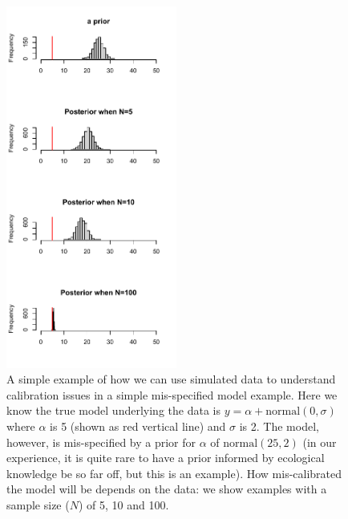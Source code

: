 \documentclass[11pt]{article}
\begin{document}
\begin{figure}[ht]
\centering
\noindent \includegraphics[width=0.5\textwidth]{examples/misspecifiedmodel/priorpostforflows.pdf}
\caption{A simple example of how we can use simulated data to understand calibration issues in a simple mis-specified model example. Here we know the true model underlying the data is $y=\alpha + \text{normal}(0, \sigma)$ where $\alpha$ is 5 (shown as red vertical line) and $\sigma$ is 2. The model, however, is mis-specified by a prior for $\alpha$ of $\text{normal}(25, 2)$ (in our experience, it is quite rare to have a prior informed by ecological knowledge be so far off, but this is an example). How mis-calibrated the model will be depends on the data: we show examples with a sample size ($N$) of 5, 10 and 100. }
\label{fig:misspecifyprior}
\end{figure}
\end{document}
